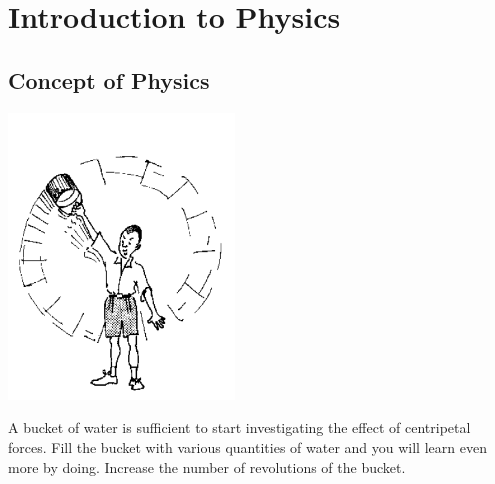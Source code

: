 \section{Introduction to Physics}

\begin{multicols}{2}


\section*{Concept of Physics}



\begin{center}
\includegraphics[width=0.45\textwidth]{./img/source/bucket-swing-2.png}
\end{center}


A bucket of water is sufficient to start investigating the effect of centripetal forces. Fill the
bucket with various quantities of water and you will learn even more by doing. Increase the
number of revolutions of the bucket.\\


\end{multicols}
